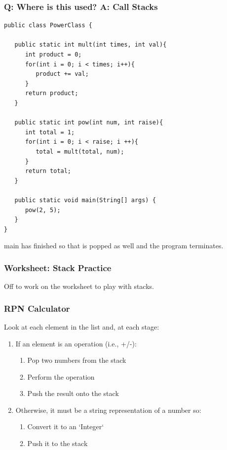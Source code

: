 \documentclass{beamer}
\begin{document}
\begin{frame}[fragile]
    \frametitle{Q: Where is this used? A: Call Stacks}
    \begin{minipage}{0.54\textwidth}
    \begin{lstlisting}[frame=trBL, basicstyle=\tiny]
public class PowerClass {
   
   public static int mult(int times, int val){
      int product = 0;
      for(int i = 0; i < times; i++){
         product += val;
      }
      return product;
   }
   
   public static int pow(int num, int raise){
      int total = 1;
      for(int i = 0; i < raise; i ++){
         total = mult(total, num);
      }
      return total;
   }
   
   public static void main(String[] args) {
      pow(2, 5);
   }
}
    \end{lstlisting}
    \end{minipage}
	\hfill
    \begin{minipage}{0.44\textwidth}
        \begin{drawstack}
        \end{drawstack}
    \end{minipage}
    \centering 
    main has finished so that is popped as well and the program terminates.
\end{frame}




\begin{frame}
    \frametitle{Worksheet: Stack Practice}
    \centering
    \vfill
    Off to work on the worksheet to play with stacks.
    \vfill
\end{frame}


\begin{frame}
    \frametitle{RPN Calculator}
    Look at each element in the list and, at each stage:
    \begin{enumerate}
        \item If an element is an operation (i.e., +/-):
            \begin{enumerate}
                \item Pop two numbers from the stack
                \item Perform the operation
                \item Push the result onto the stack
            \end{enumerate}
        \item Otherwise, it must be a string representation of a number so:
            \begin{enumerate}
                \item Convert it to an `Integer`
                \item Push it to the stack
            \end{enumerate}
    \end{enumerate}
\end{frame}
\end{document}
